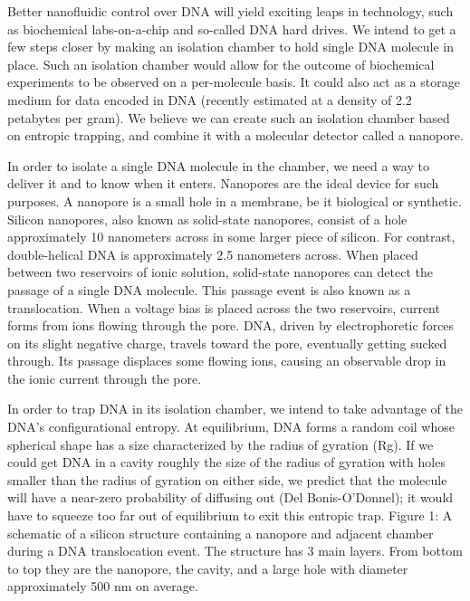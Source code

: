 \documentclass[aps,prl,preprint,groupedaddress]{revtex4}
\begin{document}
Better nanofluidic control over DNA will yield exciting leaps in technology, such as biochemical labs-on-a-chip and so-called DNA hard drives. We intend to get a few steps closer by making an isolation chamber to hold single DNA molecule in place. Such an isolation chamber would allow for the outcome of biochemical experiments to be observed on a per-molecule basis. It could also act as a storage medium for data encoded in DNA (recently estimated at a density of 2.2 petabytes per gram). We believe we can create such an isolation chamber based on entropic trapping, and combine it with a molecular detector called a nanopore.

In order to isolate a single DNA molecule in the chamber, we need a way to deliver it and to know when it enters. Nanopores are the ideal device for such purposes. A nanopore is a small hole in a membrane, be it biological or synthetic. Silicon nanopores, also known as solid-state nanopores, consist of a hole approximately 10 nanometers across in some larger piece of silicon. For contrast, double-helical DNA is approximately 2.5 nanometers across. When placed between two reservoirs of ionic solution, solid-state nanopores can detect the passage of a single DNA molecule. This passage event is also known as a translocation. When a voltage bias is placed across the two reservoirs, current forms from ions flowing through the pore. DNA, driven by electrophoretic forces on its slight negative charge, travels toward the pore, eventually getting sucked through. Its passage displaces some flowing ions, causing an observable drop in the ionic current through the pore.

In order to trap DNA in its isolation chamber, we intend to take advantage of the DNA’s configurational entropy. At equilibrium, DNA forms a random coil whose spherical shape has a size characterized by the radius of gyration (Rg). If we could get DNA in a cavity roughly the size of the radius of gyration with holes smaller than the radius of gyration on either side, we predict that the molecule will have a near-zero probability of diffusing out (Del Bonis-O’Donnel); it would have to squeeze too far out of equilibrium to exit this entropic trap.
Figure 1: A schematic of a silicon structure containing a nanopore and adjacent chamber during a DNA translocation event. The structure has 3 main layers. From bottom to top they are the nanopore, the cavity, and a large hole with diameter approximately 500 nm on average.
\end{document}

